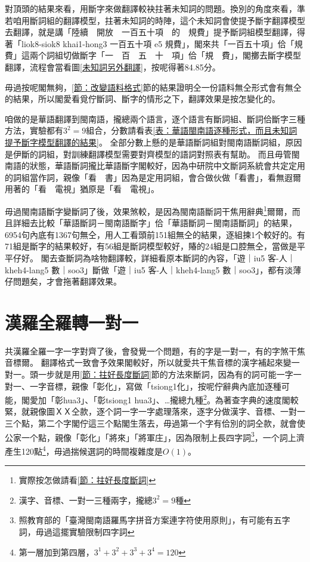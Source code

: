 對頂頭的結果來看，用斷字來做翻譯較袂拄著未知詞的問題。換別的角度來看，準若咱用斷詞組的翻譯模型，拄著未知詞的時陣，這个未知詞會使提予斷字翻譯模型去翻譯，就是講「陸續　開放　一百五十項　的　規費」提予斷詞組模型翻譯，得著「liok8-siok8 khai1-hong3 一百五十項 e5 規費」，閣來共「一百五十項」佮「規費」這兩个詞組切做斷字「一　百　五　十　項」佮「規　費」，閣擲去斷字模型翻譯，流程會當看圖\ref{未知詞另外翻譯}，按呢得著84.85分。

毋過按呢閣無夠，\ref{節：改變語料格式}節的結果證明仝一份語料無仝形式會有無仝的結果，所以閣愛看覓佇斷詞、斷字的情形之下，翻譯效果是按怎變化的。

咱做的是華語翻譯到閩南語，攏總兩个語言，逐个語言有斷詞組、斷詞佮斷字三種方法，實驗都有$3^{2}=9$組合，分數請看表\ref{表：華語閩南語逐種形式，而且未知詞提予斷字模型翻譯的結果}。
全部分數上懸的是華語斷詞組對閩南語斷詞組，原因是伊斷的詞組，對訓練翻譯模型需要對齊模型的語詞對照表有幫助。
而且毋管閩南語的狀態，華語斷詞攏比華語斷字閣較好，因為中研院中文斷詞系統會共定定用的詞組當作詞，親像「看　書」因為是定用詞組，會合做伙做「看書」，看無遐爾用著的「看　電視」猶原是「看　電視」。

毋過閩南語斷字變斷詞了後，效果煞較，是因為閩南語斷詞干焦用辭典\footnote{實際按怎做請看\ref{節：拄好長度斷詞}}爾爾，而且詳細去比較「華語斷詞－閩南語斷字」佮「華語斷詞－閩南語斷詞」的結果，6954句內底有1367句無仝，用人工看頭前151組無仝的結果，逐組揀1个較好的。有71組是斷字的結果較好，有56組是斷詞模型較好，賰的24組是口腔無仝，當做是平平仔好。
閣去查斷詞為啥物翻譯較，詳細看原本斷詞的內容，「遊｜iu5 客-人｜kheh4-lang5 數｜soo3」斷做「遊｜iu5 客-人｜kheh4-lang5 數｜soo3」，都有淡薄仔問題矣，才會拖著翻譯效果。

\section{漢羅全羅轉一對一}
\label{節：漢羅全羅轉一對一}
共漢羅全羅一字一字對齊了後，會發覺一个問題，有的字是一對一，有的字煞干焦音標爾。
翻譯格式一致會予效果閣較好，所以就愛共干焦音標的漢字補起來變一對一。頭一步就是用\ref{節：拄好長度斷詞}節的方法來斷詞，因為有的詞可能一字一對一、一字音標，親像「彰化」，寫做「tsiong1化」，按呢佇辭典內底加逐種可能，閣愛加「彰hua3」、「彰tsiong1 hua3」、…攏總九種\footnote{漢字、音標、一對一三種兩字，攏總$3^{2}=9$種}。為著查字典的速度閣較緊，就親像圖ＸＸ仝款，逐个詞一字一字處理落來，逐字分做漢字、音標、一對一三个點，第二个字閣佇這三个點閣生落去，毋過第一个字有佮別的詞仝款，就會使公家一个點，親像「彰化」「將來」「將軍庄」，因為限制上長四字詞\footnote{照教育部的「臺灣閩南語羅馬字拼音方案連字符使用原則」，有可能有五字詞，毋過這擺實驗限制四字詞}，一个詞上濟產生120點\footnote{第一層加到第四層，$3^{1}+3^{2}+3^{3}+3^{4}=120$}，毋過揣候選詞的時間複雜度是$O(1)$。

